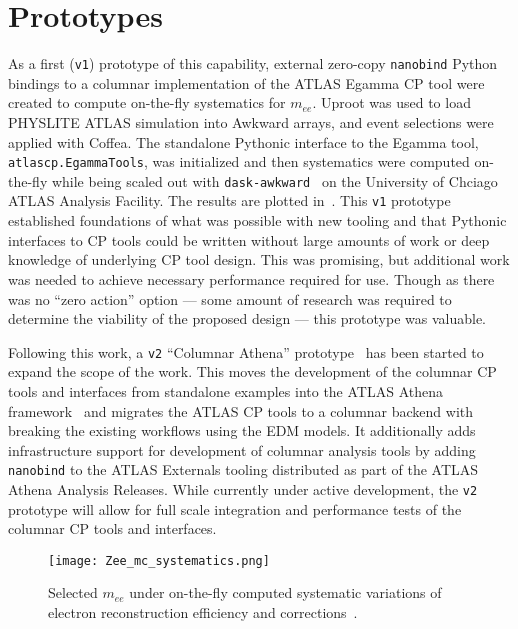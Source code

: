 \section{Prototypes}\label{sec:prototypes}

As a first (\texttt{v1}) prototype of this capability, external zero-copy \texttt{nanobind} Python bindings to a columnar implementation of the ATLAS Egamma CP tool were created to compute on-the-fly systematics for $m_{ee}$.
Uproot was used to load PHYSLITE ATLAS simulation into Awkward arrays, and event selections were applied with Coffea.
The standalone Pythonic interface to the Egamma tool, \texttt{atlascp.EgammaTools}, was initialized and then systematics were computed on-the-fly while being scaled out with \texttt{dask-awkward}~\cite{dask_awkward_2024} on the University of Chciago ATLAS Analysis Facility.
The results are plotted in~.
This \texttt{v1} prototype established foundations of what was possible with new tooling and that Pythonic interfaces to CP tools could be written without large amounts of work or deep knowledge of underlying CP tool design.
This was promising, but additional work was needed to achieve necessary performance required for use.
Though as there was no ``zero action'' option --- some amount of research was required to determine the viability of the proposed design --- this prototype was valuable.

Following this work, a \texttt{v2} ``Columnar Athena'' prototype~\cite{columnar_athena} has been started to expand the scope of the work.
This moves the development of the columnar CP tools and interfaces from standalone examples into the ATLAS Athena framework~\cite{ATLAS_Athena} and migrates the ATLAS CP tools to a columnar backend with breaking the existing workflows using the EDM models.
It additionally adds infrastructure support for development of columnar analysis tools by adding \texttt{nanobind} to the ATLAS Externals tooling distributed as part of the ATLAS Athena Analysis Releases.
While currently under active development, the \texttt{v2} prototype will allow for full scale integration and performance tests of the columnar CP tools and interfaces.

\begin{figure}
    \centering
    \texttt{[image: Zee\_mc\_systematics.png]}
    \caption{Selected $m_{ee}$ under on-the-fly computed systematic variations of electron reconstruction efficiency and corrections~\cite{Vigl:ACAT_2024}.}
    \label{fig:Zee_mc_systematics}
\end{figure}
